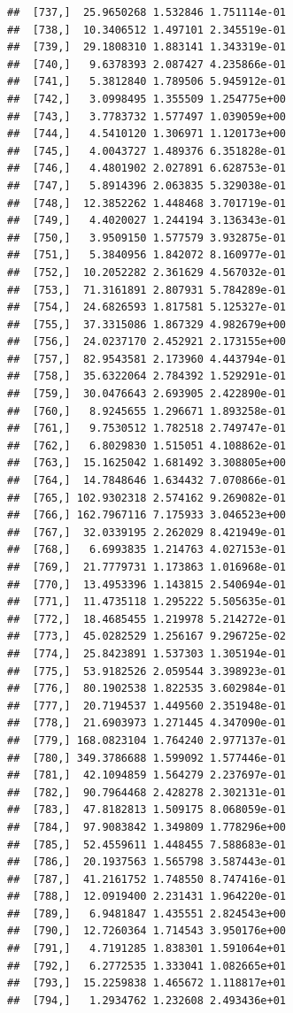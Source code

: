 \documentclass[article]{jss}\usepackage[]{graphicx}\usepackage[]{xcolor}
\makeatletter
\newenvironment{kframe}{%
 \def\at@end@of@kframe{}%
 \ifinner\ifhmode%
  \def\at@end@of@kframe{\end{minipage}}%
  \begin{minipage}{\columnwidth}%
 \fi\fi%
 \def\FrameCommand##1{\hskip\@totalleftmargin \hskip-\fboxsep
 \colorbox{shadecolor}{##1}\hskip-\fboxsep
     \hskip-\linewidth \hskip-\@totalleftmargin \hskip\columnwidth}%
 \MakeFramed {\advance\hsize-\width
   \@totalleftmargin\z@ \linewidth\hsize
   \@setminipage}}%
 {\par\unskip\endMakeFramed%
 \at@end@of@kframe}
\newenvironment{knitrout}{}{} %
\makeatother
\begin{document}
\begin{knitrout}
\begin{kframe}
\begin{verbatim}
##  [737,]  25.9650268 1.532846 1.751114e-01
##  [738,]  10.3406512 1.497101 2.345519e-01
##  [739,]  29.1808310 1.883141 1.343319e-01
##  [740,]   9.6378393 2.087427 4.235866e-01
##  [741,]   5.3812840 1.789506 5.945912e-01
##  [742,]   3.0998495 1.355509 1.254775e+00
##  [743,]   3.7783732 1.577497 1.039059e+00
##  [744,]   4.5410120 1.306971 1.120173e+00
##  [745,]   4.0043727 1.489376 6.351828e-01
##  [746,]   4.4801902 2.027891 6.628753e-01
##  [747,]   5.8914396 2.063835 5.329038e-01
##  [748,]  12.3852262 1.448468 3.701719e-01
##  [749,]   4.4020027 1.244194 3.136343e-01
##  [750,]   3.9509150 1.577579 3.932875e-01
##  [751,]   5.3840956 1.842072 8.160977e-01
##  [752,]  10.2052282 2.361629 4.567032e-01
##  [753,]  71.3161891 2.807931 5.784289e-01
##  [754,]  24.6826593 1.817581 5.125327e-01
##  [755,]  37.3315086 1.867329 4.982679e+00
##  [756,]  24.0237170 2.452921 2.173155e+00
##  [757,]  82.9543581 2.173960 4.443794e-01
##  [758,]  35.6322064 2.784392 1.529291e-01
##  [759,]  30.0476643 2.693905 2.422890e-01
##  [760,]   8.9245655 1.296671 1.893258e-01
##  [761,]   9.7530512 1.782518 2.749747e-01
##  [762,]   6.8029830 1.515051 4.108862e-01
##  [763,]  15.1625042 1.681492 3.308805e+00
##  [764,]  14.7848646 1.634432 7.070866e-01
##  [765,] 102.9302318 2.574162 9.269082e-01
##  [766,] 162.7967116 7.175933 3.046523e+00
##  [767,]  32.0339195 2.262029 8.421949e-01
##  [768,]   6.6993835 1.214763 4.027153e-01
##  [769,]  21.7779731 1.173863 1.016968e-01
##  [770,]  13.4953396 1.143815 2.540694e-01
##  [771,]  11.4735118 1.295222 5.505635e-01
##  [772,]  18.4685455 1.219978 5.214272e-01
##  [773,]  45.0282529 1.256167 9.296725e-02
##  [774,]  25.8423891 1.537303 1.305194e-01
##  [775,]  53.9182526 2.059544 3.398923e-01
##  [776,]  80.1902538 1.822535 3.602984e-01
##  [777,]  20.7194537 1.449560 2.351948e-01
##  [778,]  21.6903973 1.271445 4.347090e-01
##  [779,] 168.0823104 1.764240 2.977137e-01
##  [780,] 349.3786688 1.599092 1.577446e-01
##  [781,]  42.1094859 1.564279 2.237697e-01
##  [782,]  90.7964468 2.428278 2.302131e-01
##  [783,]  47.8182813 1.509175 8.068059e-01
##  [784,]  97.9083842 1.349809 1.778296e+00
##  [785,]  52.4559611 1.448455 7.588683e-01
##  [786,]  20.1937563 1.565798 3.587443e-01
##  [787,]  41.2161752 1.748550 8.747416e-01
##  [788,]  12.0919400 2.231431 1.964220e-01
##  [789,]   6.9481847 1.435551 2.824543e+00
##  [790,]  12.7260364 1.714543 3.950176e+00
##  [791,]   4.7191285 1.838301 1.591064e+01
##  [792,]   6.2772535 1.333041 1.082665e+01
##  [793,]  15.2259838 1.465672 1.118817e+01
##  [794,]   1.2934762 1.232608 2.493436e+01

\end{verbatim}
\end{kframe}
\end{knitrout}
\end{document}
